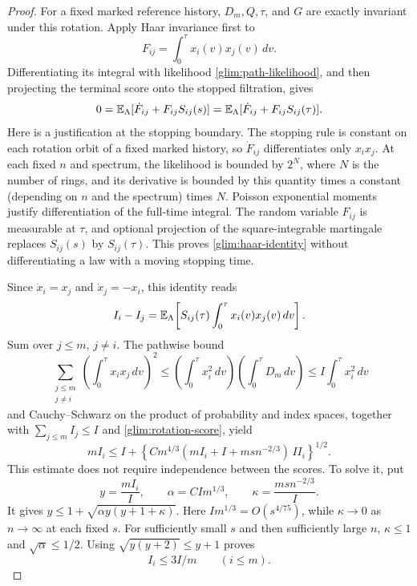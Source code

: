 \begin{proof}
For a fixed marked reference history, \(D_m,Q,\tau\), and \(G\) are
exactly invariant under this rotation.  Apply Haar invariance first
to
\[
 F_{ij}=\int_0^\tau x_i(v)x_j(v)\,dv.
\]
Differentiating its integral with likelihood
\eqref{glim:path-likelihood}, and then projecting the terminal score
onto the stopped filtration, gives
\begin{equation}
 0=\mathbb E_\Lambda[\dot F_{ij}+F_{ij}S_{ij}(s)]
   =\mathbb E_\Lambda[\dot F_{ij}+F_{ij}S_{ij}(\tau)].
 \label{glim:haar-identity}
\end{equation}
Here is a justification at the stopping boundary.  The stopping
rule is constant on each rotation orbit of a fixed marked history,
so \(\dot F_{ij}\) differentiates only \(x_i x_j\).
At each fixed \(n\) and spectrum, the likelihood is bounded by
\(2^N\), where \(N\) is the number of rings, and its derivative is
bounded by this quantity times a constant (depending on \(n\) and
the spectrum) times \(N\).  Poisson exponential moments justify
differentiation of the full-time integral.  The random variable
\(F_{ij}\) is measurable at \(\tau\), and optional projection of
the square-integrable martingale replaces \(S_{ij}(s)\) by
\(S_{ij}(\tau)\).  This proves \eqref{glim:haar-identity} without
differentiating a law with a moving stopping time.

Since \(\dot x_i=x_j\) and \(\dot x_j=-x_i\), this identity reads
\[
 I_i-I_j=\mathbb E_\Lambda\!\left[
 S_{ij}(\tau)\int_0^\tau x_i(v)x_j(v)\,dv\right].
\]
Sum over \(j\le m\), \(j\ne i\).  The pathwise bound
\[
 \sum_{\substack{j\le m\\j\ne i}}\left(\int_0^\tau x_i x_j\,dv\right)^2
 \le \left(\int_0^\tau x_i^2\,dv\right)
       \left(\int_0^\tau D_m\,dv\right)
 \le I\int_0^\tau x_i^2\,dv
\]
and Cauchy--Schwarz on the product of probability and index spaces,
together with \(\sum_{j\le m} I_j\le I\) and
\eqref{glim:rotation-score}, yield
\begin{equation}
 m I_i\le I+
 \left\{C m^{4/3}
       (m I_i+I+m s n^{-2/3})\,I I_i\right\}^{1/2}.
 \label{glim:integrated-rotation}
\end{equation}
This estimate does not require independence between the scores.
To solve it, put
\[
 y=\frac{m I_i}{I},\qquad
 \alpha=C I m^{1/3},\qquad
 \kappa=\frac{m s n^{-2/3}}{I}.
\]
It gives \(y\le1+\sqrt{\alpha y(y+1+\kappa)}\).
Here \(I m^{1/3}=O(s^{4/75})\), while \(\kappa\to0\) as
\(n\to\infty\) at each fixed \(s\).  For sufficiently small \(s\)
and then sufficiently large \(n\), \(\kappa\le1\) and
\(\sqrt\alpha\le1/2\).  Using
\(\sqrt{y(y+2)}\le y+1\) proves
\begin{equation}
 I_i\le 3I/m\qquad(i\le m).
 \label{glim:individual-integral}
\end{equation}


\end{proof}
